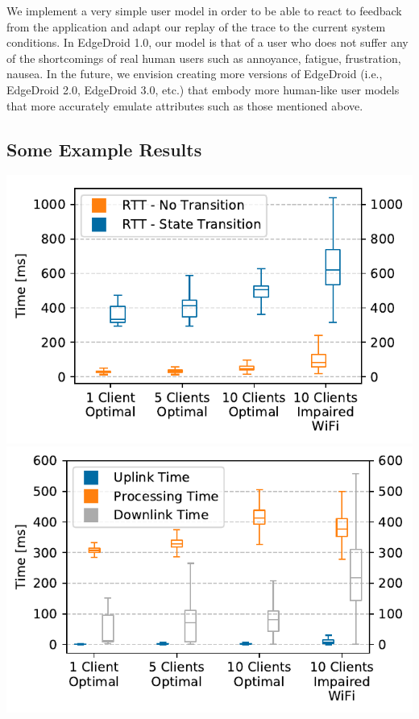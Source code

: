 \documentclass[portrait, a1]{KTHEEposter}
\begin{document}
\begin{pcolumns}[3]
\begin{pcolumn}[2]
\begin{pframe}[1.1]
            We implement a very simple user model in order to be able to react to feedback from the application and adapt our replay of the trace to the current system conditions.
            In EdgeDroid 1.0, our model is that of a user who does not suffer any of the shortcomings of real human users such as annoyance, fatigue, frustration, nausea.            
            In the future, we envision creating  more versions of EdgeDroid (i.e., EdgeDroid 2.0, EdgeDroid 3.0, etc.) that embody more human-like user models that more accurately emulate attributes such as those mentioned above. 
        \end{pframe}%
    \end{pcolumn}%
    \begin{pcolumn}[2]
        \begin{pframe}[1.55]
            \section{Some Example Results}
            \begin{center}
                \medskip
                \includegraphics[width=\linewidth]{plots/comparison/rtt_fb_vs_nofb.pdf}
                \medskip
                \includegraphics[width=\linewidth]{plots/comparison/box_feedback.pdf}

\end{center}
\end{pframe}
\end{pcolumn}
\end{pcolumns}
\end{document}
